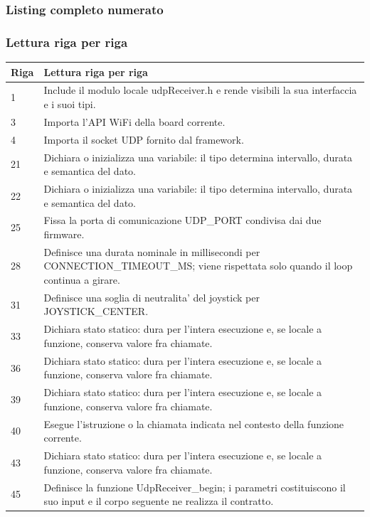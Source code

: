 \documentclass[11pt,a4paper]{article}
\begin{document}
\subsubsection{Listing completo numerato}


\subsubsection{Lettura riga per riga}
\begin{longtable}{p{}p{}}
\toprule
\textbf{Riga} & \textbf{Lettura riga per riga} \\
\midrule
\endhead
1 & Include il modulo locale udpReceiver.h e rende visibili la sua interfaccia e i suoi tipi. \\
3 & Importa l'API WiFi della board corrente. \\
4 & Importa il socket UDP fornito dal framework. \\
21 & Dichiara o inizializza una variabile: il tipo determina intervallo, durata e semantica del dato. \\
22 & Dichiara o inizializza una variabile: il tipo determina intervallo, durata e semantica del dato. \\
25 & Fissa la porta di comunicazione UDP\_\allowbreak{}PORT condivisa dai due firmware. \\
28 & Definisce una durata nominale in millisecondi per CONNECTION\_\allowbreak{}TIMEOUT\_\allowbreak{}MS; viene rispettata solo quando il loop continua a girare. \\
31 & Definisce una soglia di neutralita' del joystick per JOYSTICK\_\allowbreak{}CENTER. \\
33 & Dichiara stato statico: dura per l'intera esecuzione e, se locale a funzione, conserva valore fra chiamate. \\
36 & Dichiara stato statico: dura per l'intera esecuzione e, se locale a funzione, conserva valore fra chiamate. \\
39 & Dichiara stato statico: dura per l'intera esecuzione e, se locale a funzione, conserva valore fra chiamate. \\
40 & Esegue l'istruzione o la chiamata indicata nel contesto della funzione corrente. \\
43 & Dichiara stato statico: dura per l'intera esecuzione e, se locale a funzione, conserva valore fra chiamate. \\
45 & Definisce la funzione UdpReceiver\_\allowbreak{}begin; i parametri costituiscono il suo input e il corpo seguente ne realizza il contratto. \\

\end{longtable}
\end{document}
